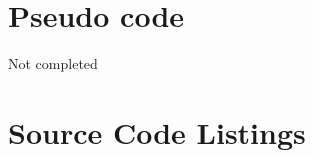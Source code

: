 \documentclass{article}
\begin{document}
\FloatBarrier

\section{Pseudo code}

Not completed











\section{Source Code Listings}

\lstset{linewidth = 16cm, xrightmargin = 0cm}
\lstlistoflistings








\end{document}
